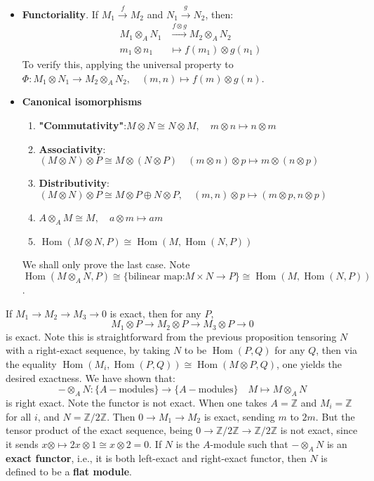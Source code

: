 \documentclass[12pt]{article}
\theoremstyle{definition}
\theoremstyle{plain}
\DeclareMathOperator{\Hom}{Hom}
\newcommand{\z}{\mathbb{Z}}
\begin{document}
\begin{itemize}
  \item \textbf{Functoriality}. If $M_1\overset{f}{\to} M_2$ and $N_1\overset{g}{\to} N_2$, then:
  \begin{align*}
    M_1\otimes _A N_1&\overset{f\otimes g}{\longrightarrow} M_2\otimes_A N_2\\
    m_1\otimes n_1&\mapsto f(m_1)\otimes g(n_1)
  \end{align*}
  To verify  this, applying the universal property to $\Phi: M_1\otimes N_1\to M_2\otimes_AN_2, \quad (m,n)\mapsto f(m)\otimes g(n)$.
  \item \textbf{Canonical isomorphisms}
    \begin{enumerate}
      \item \textbf{"Commutativity"}:$M\otimes N\cong N\otimes M, \quad m\otimes n\mapsto n\otimes m$
      \item \textbf{Associativity}:$(M\otimes N)\otimes P\cong M\otimes(N\otimes P) \quad (m\otimes n)\otimes p\mapsto m\otimes(n\otimes p)$
      \item \textbf{Distributivity}: $(M\otimes N)\otimes P\cong M\otimes P\oplus N\otimes P, \quad (m, n)\otimes p\mapsto (m\otimes p, n\otimes p)$
      \item $A\otimes_A M\cong M, \quad a\otimes m\mapsto am$
      \item $\Hom(M\otimes N, P)\cong \Hom(M, \Hom(N, P))$
    \end{enumerate}
    \proof We shall only prove the last case. Note $$\Hom(M\otimes_A N, P)\cong \{\text{bilinear map:} M\times N \to P \}\cong \Hom(M, \Hom(N, P))$$.
\end{itemize}
\Prop If $M_1\to M_2\to M_3\to 0$ is exact, then for any $P$,
$$M_1\otimes P\to M_2\otimes P\to M_3\otimes P\to 0$$ is exact.
\proof Note this is straightforward from the previous proposition tensoring $N$ with a right-exact sequence, by taking $N$ to be $\Hom(P, Q)$ for any $Q$, then via the equality $\Hom(M_i, \Hom(P, Q))\cong \Hom(M\otimes P, Q)$, one yields the desired exactness.
\Rmk We have shown that:
$$-\otimes_A N: \{A-\text{modules}\}\to \{A-\text{modules}\} \quad M\mapsto M\otimes_A N$$
is right exact. Note the functor is not exact. When one takes $A=\z$ and $M_i=\z$ for all $i$, and $N=\z/2\z$. Then $0\to M_1\to M_2$ is exact, sending $m$ to $2m$. But the tensor product of the exact sequence, being $0\to \z/2\z\to \z/2\z$ is not exact, since it sends $x\otimes \mapsto 2x\otimes 1\cong x\otimes 2=0$.
\Def If $N$ is the $A$-module such that $-\otimes_A N$ is an \textbf{exact functor}, i.e., it is both left-exact and right-exact functor,  then $N$ is defined to be a \textbf{flat module}.
\end{document}
